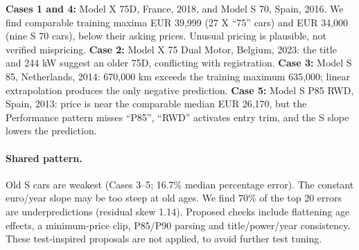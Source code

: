 \textbf{Cases 1 and 4:} Model X 75D, France, 2018, and Model S 70, Spain, 2016. We find comparable training maxima EUR 39,999 (27 X ``75'' cars) and EUR 34,000 (nine S 70 cars), below their asking prices. Unusual pricing is plausible, not verified mispricing. \textbf{Case 2:} Model X 75 Dual Motor, Belgium, 2023: the title and 244 kW suggest an older 75D, conflicting with registration. \textbf{Case 3:} Model S 85, Netherlands, 2014: 670,000 km exceeds the training maximum 635,000; linear extrapolation produces the only negative prediction. \textbf{Case 5:} Model S P85 RWD, Spain, 2013: price is near the comparable median EUR 26,170, but the Performance pattern misses ``P85'', ``RWD'' activates entry trim, and the S slope lowers the prediction.

\paragraph{Shared pattern.} Old S cars are weakest (Cases 3--5; 16.7\% median percentage error). The constant euro/year slope may be too steep at old ages. We find 70\% of the top 20 errors are underpredictions (residual skew 1.14). Proposed checks include flattening age effects, a minimum-price clip, P85/P90 parsing and title/power/year consistency. These test-inspired proposals are not applied, to avoid further test tuning.